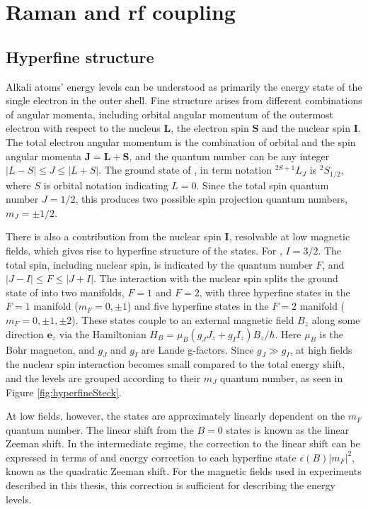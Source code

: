 \section{Raman and rf coupling}\label{chap:4sec:rf}

\subsection{Hyperfine structure}
	Alkali atoms' energy levels can be understood as primarily the energy state of the single electron in the outer shell. Fine structure arises from different combinations of angular momenta, including orbital angular momentum of the outermost electron with respect to the nucleus $\mathbf{L}$, the electron spin $\mathbf{S}$ and the nuclear spin $\mathbf{I}$. The total electron angular momentum is the combination of orbital and the spin angular momenta $\mathbf{J} = \mathbf{L} +\mathbf{S}$, and the quantum number can be any integer $|L - S| \leq J \leq |L + S|$. The ground state of \Rb{}, in term notation $^{2S+1}L_J$ is $^2S_{1/2}$, where $S$ is orbital notation indicating $L=0$. Since the total spin quantum number $J=1/2$, this produces two possible spin projection quantum numbers, $m_J=\pm1/2$.

	There is also a contribution from the nuclear spin $\mathbf{I}$, resolvable at low magnetic fields, which gives rise to hyperfine structure of the states. For \Rb{}, $I=3/2$. The total spin, including nuclear spin, is indicated by the quantum number $F$, and $|J - I| \leq F \leq |J + I|$. The interaction with the nuclear spin splits the ground state of \Rb{} into two manifolds, $F=1$ and $F=2$, with three hyperfine states in the $F=1$ manifold ($m_F=0,\pm1$) and five hyperfine states in the $F=2$ manifold ($m_F=0,\pm1,\pm2$). These states couple to an external magnetic field $B_z$ along some direction $\mathbf{e}_z$ via the Hamiltonian $H_B=\mu_B(g_JJ_z+g_II_z)B_z/\hbar$. Here $\mu_B$ is the Bohr magneton, and $g_J$ and $g_I$ are Lande g-factors. Since $g_J\gg g_I$, at high fields the nuclear spin interaction becomes small compared to the total energy shift, and the levels are grouped according to their $m_J$ quantum number, as seen in Figure \ref{fig:hyperfineSteck}.

At low fields, however, the states are approximately linearly dependent on the $m_F$ quantum number. The linear shift from the $B=0$ states is known as the linear Zeeman shift. In the intermediate regime, the correction to the linear shift can be expressed in terms of and energy correction to each hyperfine state $\epsilon(B)|m_F|^2$, known as the quadratic Zeeman shift. For the magnetic fields used in experiments described in this thesis, this correction is sufficient for describing the energy levels. 

